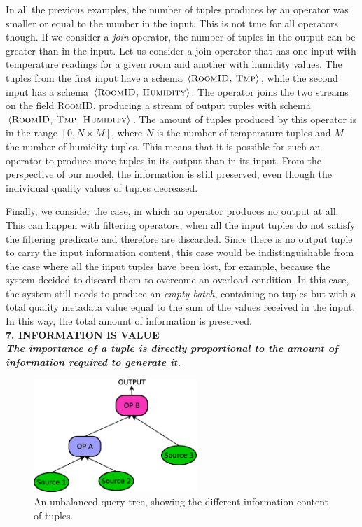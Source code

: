 In all the previous examples, the number of tuples produces by an operator was smaller or equal to the
number in the input. This is not true for all operators though. If we consider a \textit{join} operator,
the number of tuples in the output can be greater than in the input. Let us consider a join
operator that has one input with temperature readings for a given room and another with
humidity values. The tuples from the first input have a schema $\langle\textsc{RoomID, Tmp} \rangle$,
while the second input has a schema $\langle\textsc{RoomID, Humidity}\rangle$. The operator joins the two
streams on the field \textsc{RoomID}, producing a stream of output tuples with schema
$\langle\textsc{RoomID, Tmp, Humidity}\rangle$. The amount of tuples produced by this operator is in the
range $[0, N{\times} M]$, where $N$ is the number of temperature tuples and $M$ the number of humidity
tuples.
This means that it is possible for such an operator to produce more tuples in its output than in its
input. From the perspective of our model, the information is still preserved, even though the individual
quality values of tuples decreased.
 	
 	Finally, we consider the case, in which an operator produces no output at all. This can happen
 	with filtering operators, when all the input tuples do not satisfy the filtering predicate and therefore
 	are discarded. Since there is no output tuple to carry the input information content, this case
 	would be indistinguishable from the case where all the input tuples have been lost, for example, because the
 	system decided to discard them to overcome an overload condition. In this case, the system
 	still needs to produce an \textit{empty batch}, containing no tuples but with a total quality metadata
 	value equal to the sum of the values received in the input. In this way, the total amount of
 	information is preserved. \\
 	 
\textbf{7. INFORMATION IS VALUE \\ \textit{The importance of a tuple is directly proportional to the
amount of information required to generate it.}}

\begin{figure}[b!]
	\centering
	\includegraphics[width=0.55\textwidth]{img/tesi/unbalanced-tree_senza}
	\caption{An unbalanced query tree, showing the different information content of tuples.}
	\label{fig:unbalanced-tree}
\end{figure}

